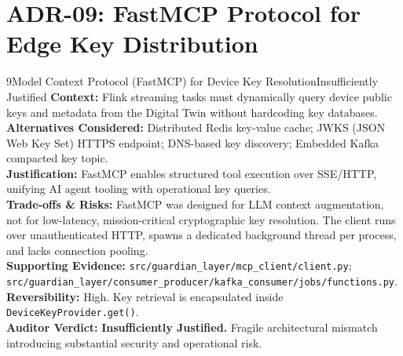 \documentclass[10pt,a4paper]{report}
\begin{document}
\section{ADR-09: FastMCP Protocol for Edge Key Distribution}
\begin{adrbox}{9}{Model Context Protocol (FastMCP) for Device Key Resolution}{Insufficiently Justified}
\textbf{Context:} Flink streaming tasks must dynamically query device public keys and metadata from the Digital Twin without hardcoding key databases.\\
\textbf{Alternatives Considered:} Distributed Redis key-value cache; JWKS (JSON Web Key Set) HTTPS endpoint; DNS-based key discovery; Embedded Kafka compacted key topic.\\
\textbf{Justification:} FastMCP enables structured tool execution over SSE/HTTP, unifying AI agent tooling with operational key queries.\\
\textbf{Trade-offs \& Risks:} FastMCP was designed for LLM context augmentation, not for low-latency, mission-critical cryptographic key resolution. The client runs over unauthenticated HTTP, spawns a dedicated background thread per process, and lacks connection pooling.\\
\textbf{Supporting Evidence:} \texttt{src/guardian\_layer/mcp\_client/client.py}; \texttt{src/guardian\_layer/consumer\_producer/kafka\_consumer/jobs/functions.py}.\\
\textbf{Reversibility:} High. Key retrieval is encapsulated inside \texttt{DeviceKeyProvider.get()}.\\
\textbf{Auditor Verdict:} \textbf{Insufficiently Justified.} Fragile architectural mismatch introducing substantial security and operational risk.
\end{adrbox}
\end{document}
